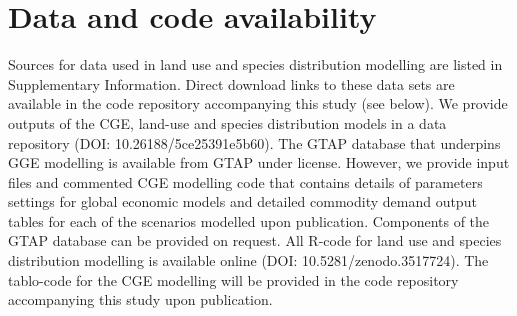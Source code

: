 \section{Data and code availability}
Sources for data used in land use and species distribution modelling are listed in Supplementary Information. Direct download links to these data sets are available in the code repository accompanying this study (see below). We provide outputs of the CGE, land-use and species distribution models in a data repository (DOI: 10.26188/5ce25391e5b60). The GTAP database that underpins GGE modelling is available from GTAP under license. However, we provide input files and commented CGE modelling code that contains details of parameters settings for global economic models and detailed commodity demand output tables for each of the scenarios modelled upon publication. Components of the GTAP database can be provided on request. All R-code for land use and species distribution modelling is available online (DOI: 10.5281/zenodo.3517724). The tablo-code for the CGE modelling will be provided in the code repository accompanying this study upon publication.
